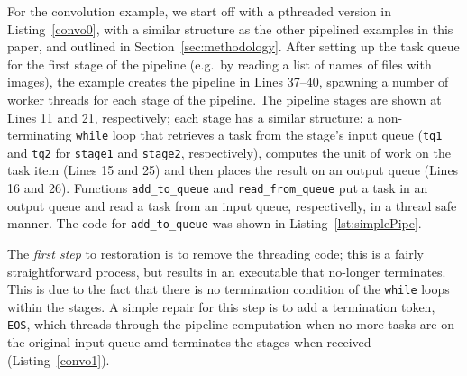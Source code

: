 \noindent
For the convolution example, we start off with a pthreaded version in Listing~\ref{convo0}, with a similar structure as the other pipelined examples in this paper, and outlined in Section~\ref{sec:methodology}. After setting up the task queue for the first stage of the pipeline (e.g.~by reading a list of names of files with images), the example creates the pipeline in Lines 37--40, spawning a number of worker threads for each stage of the pipeline. The pipeline stages are shown at Lines 11 and 21, respectively; each stage has a similar structure: a non-terminating \lstinline{while} loop that retrieves a task from the stage's input queue (\lstinline{tq1} and \lstinline{tq2} for \lstinline{stage1} and \lstinline{stage2}, respectively), computes the unit of work on the task item (Lines 15 and 25) and then places the result on an output queue (Lines 16 and 26). Functions \lstinline{add_to_queue} and \lstinline{read_from_queue} put a task in an output queue and read a task from an input queue, respectivelly, in a thread safe manner. The code for \lstinline{add_to_queue} was shown in Listing~\ref{lst:simplePipe}.

The \emph{first step} to restoration is to remove the threading code; this is a fairly straightforward process, but results in an executable that no-longer terminates. This is due to the fact that there is no termination condition of the \lstinline{while} loops within the stages. A simple repair for this step is to add a termination token, \lstinline{EOS}, which threads through the pipeline computation when no more tasks are on the original input queue amd terminates the stages when received (Listing~\ref{convo1}).

